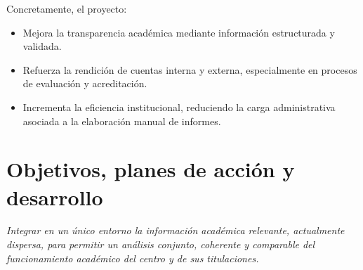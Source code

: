 \documentclass[11pt,a4paper]{scrreprt}
\begin{document}
Concretamente, el proyecto:
\begin{itemize}[noitemsep,topsep=2pt]
\item Mejora la transparencia académica mediante información estructurada y validada.
\item Refuerza la rendición de cuentas interna y externa, especialmente en procesos de evaluación y acreditación.
\item Incrementa la eficiencia institucional, reduciendo la carga administrativa asociada a la elaboración manual de informes.
\end{itemize}

\section{Objetivos, planes de acción y desarrollo}
\newpage
{}
{\small\color{mutedcolor}\itshape Integrar en un único entorno la información académica relevante, actualmente dispersa, para permitir un análisis conjunto, coherente y comparable del funcionamiento académico del centro y de sus titulaciones.}\par\vspace{6pt}
\end{document}
